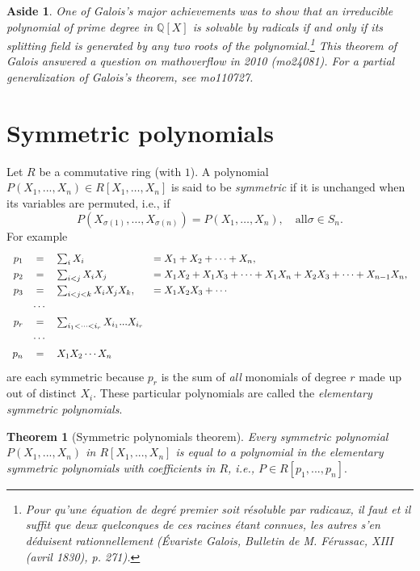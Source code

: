 \documentclass[a4paper,11pt,final,openany]{memoir}
\newtheorem{theorem}[X]{Theorem}
\newtheorem{aside}[X]{Aside}
\theoremstyle{nonumberplain}
\begin{document}
\begin{aside}
One of Galois's major achievements was to show that an irreducible polynomial
of prime degree in $\mathbb{Q}{}[X]$ is solvable by radicals if and only if
its splitting field is generated by any two roots of the
polynomial.\footnote{Pour qu'une \'{e}quation de degr\'{e} premier soit
r\'{e}soluble par radicaux, il faut et il suffit que deux quelconques de ces
racines \'{e}tant connues, les autres s'en d\'{e}duisent rationnellement
(\'{E}variste Galois, Bulletin de M. F\'{e}russac, XIII (avril 1830), p.
271).} This theorem of Galois answered a question on mathoverflow in 2010
(mo24081). For a partial generalization of Galois's theorem, see mo110727.
\end{aside}

\section{Symmetric polynomials\label{sympol}}

Let $R$ be a commutative ring (with $1$). A polynomial $P(X_{1},...,X_{n})\in
R[X_{1},\ldots,X_{n}]$ is said to be \emph{symmetric\/}%
if it is unchanged when its variables are permuted, i.e., if
\[
P(X_{\sigma(1)},\ldots,X_{\sigma(n)})=P(X_{1},\ldots,X_{n}),\quad\text{all
}\sigma\in\text{$S_{n}$}.
\]
For example
\[
\renewcommand{\arraystretch}{1.3}%
\begin{array}
[c]{rcll}%
p_{1} & = & \sum_{i}X_{i} & =X_{1}+X_{2}+\cdots+X_{n},\\
p_{2} & = & \sum_{i<{}j}X_{i}X_{j} & =X_{1}X_{2}+X_{1}X_{3}+\cdots+X_{1}%
X_{n}+X_{2}X_{3}+\cdots+X_{n-1}X_{n},\\
p_{3} & = & \sum_{i<{}j<{}k}X_{i}X_{j}X_{k}, & =X_{1}X_{2}X_{3}+\cdots\\
& \cdots &  & \\
p_{r} & = & \sum_{i_{1}<{}\cdots<{}i_{r}}X_{i_{1}}...X_{i_{r}} & \\
& \cdots &  & \\
p_{n} & = & X_{1}X_{2}\cdots X_{n} &
\end{array}
\]
are each symmetric because $p_{r}$ is the sum of \textit{all\/} monomials of
degree $r$ made up out of distinct $X_{i}$. These particular polynomials are
called the \emph{elementary symmetric polynomials}.%
%


\begin{theorem}
[Symmetric polynomials theorem]\label{ag25}Every symmetric polynomial
$P(X_{1},...,X_{n})$ in $R[X_{1},...,X_{n}]$ is equal to a polynomial in the
elementary symmetric polynomials with coefficients in $R$, i.e., $P\in
R[p_{1},...,p_{n}].$
\end{theorem}
\end{document}
